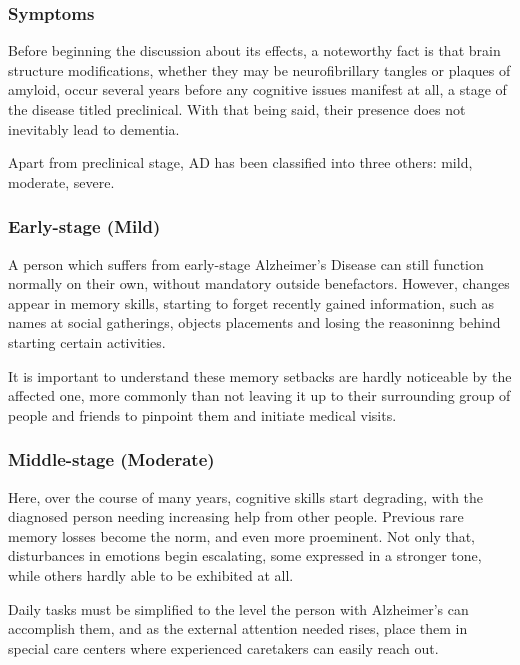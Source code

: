 \documentclass[a4paper, 12pt]{article}
\begin{document}
\subsubsection{Symptoms} %
Before beginning the discussion about its effects, a noteworthy fact is that brain structure modifications, whether they may be
neurofibrillary tangles or plaques of amyloid, occur several years before any cognitive issues manifest at all, a stage of the disease titled
preclinical. With that being said, their presence does not inevitably lead to dementia.

Apart from preclinical stage, AD has been classified into three others: mild, moderate, severe.

\subsubsection*{Early-stage (Mild)} %
A person which suffers from early-stage Alzheimer's Disease can still function normally on their own, without mandatory outside benefactors.
However, changes appear in memory skills, starting to forget recently gained information, such as names at social gatherings, objects placements
and losing the reasoninng behind starting certain activities.

It is important to understand these memory setbacks are hardly noticeable by the affected one, more commonly than not leaving it up to their
surrounding group of people and friends to pinpoint them and initiate medical visits.

\subsubsection*{Middle-stage (Moderate)} %
Here, over the course of many years, cognitive skills start degrading, with the diagnosed person needing increasing help from other people.
Previous rare memory losses become the norm, and even more proeminent. Not only that, disturbances in emotions begin escalating, some
expressed in a stronger tone, while others hardly able to be exhibited at all.

Daily tasks must be simplified to the level the person with Alzheimer's can accomplish them, and as the external attention needed rises,
place them in special care centers where experienced caretakers can easily reach out.
\end{document}
